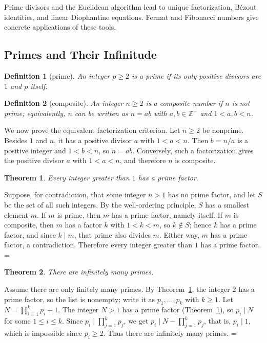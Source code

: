 \documentclass[11pt]{article}
\makeatletter
\theoremstyle{ntstyle}
\newtheorem{theorem}{Theorem}[subsection]
\newtheorem{definition}{Definition}[subsection]
\let\nt@closedisplay\]
\def\nt@guardedclose{\@ifnextchar\par{\nt@closeafterpar}{\@ifnextchar\end{\postdisplaypenalty\@M\nt@closedisplay}{\nt@closedisplay}}}
\def\nt@closeafterpar\par{\@ifnextchar\par{\nt@closeafterpar}{\@ifnextchar\end{\postdisplaypenalty\@M\nt@closedisplay\par}{\nt@closedisplay\par}}}
\renewenvironment{proof}[1][\proofname]{\par
  \pushQED{\qed}\normalfont\topsep\medskipamount\edef\nt@afterproof{\@endparpenalty=\the\@endparpenalty\relax}\@beginparpenalty\@M\@endparpenalty\@M\let\]\nt@guardedclose\trivlist\item[]\textit{#1\@addpunct{.}} \ignorespaces}{\ifvmode\addpenalty\@M\fi\popQED\nt@afterproof\endtrivlist\@endpefalse}
\makeatother
\begin{document}
Prime divisors and the Euclidean algorithm lead to unique factorization, B{\'e}zout identities, and linear Diophantine
equations. Fermat and Fibonacci numbers give concrete applications of these tools.

\subsection{Primes and Their Infinitude}

\begin{definition}[prime]\label{def:2.1.1} An integer $p \ge 2$
	is a prime if its only positive divisors are $1$ and $p$ itself.
\end{definition}
\begin{definition}[composite]\label{def:2.1.2} An integer $n \ge 2$ is a
	composite number if $n$ is not prime; equivalently, $n$ can be written as $n = ab$ with $a, b \in
	\mathbb{Z}^+$ and $1 < a, b < n$.
\end{definition}

We now prove the equivalent factorization criterion. Let $n\ge2$ be nonprime.
Besides $1$ and $n$, it has a positive divisor $a$ with $1<a<n$.
Then $b=n/a$ is a positive integer and $1<b<n$, so $n=ab$.
Conversely, such a factorization gives the positive divisor $a$ with $1<a<n$,
and therefore $n$ is composite.

\begin{theorem}\label{thm:2.1.1} Every integer greater than $1$ has
	a prime factor.
\end{theorem}

\begin{proof} Suppose, for contradiction, that some
	integer $n > 1$ has no prime factor, and let $S$ be the set of all
	such integers. By the well-ordering principle, $S$ has a smallest
	element $m$. If $m$ is prime, then $m$ has a prime factor, namely
	itself. If $m$ is composite, then $m$ has a factor
	$k$ with $1 < k < m$, so $k \notin S$; hence $k$ has a prime factor,
	and since $k \mid m$, that prime also divides $m$. Either way, $m$ has
	a prime factor, a contradiction. Therefore every integer greater than
	$1$ has a prime factor.
\end{proof}
\begin{theorem}\label{thm:2.1.2} There are infinitely many primes.
\end{theorem}

\begin{proof} Assume there are only finitely many primes.
	By Theorem~\ref{thm:2.1.1}, the integer $2$ has a prime factor, so the
	list is nonempty; write it as $p_1,\ldots,p_k$ with $k\ge1$.
	Let $N = \prod_{i=1}^{k} p_i + 1$. The integer $N > 1$
	has a prime factor (Theorem~\ref{thm:2.1.1}), so $p_i \mid N$ for some $1 \le
		i \le k$. Since $p_i \mid \prod_{j=1}^{k} p_j$, we get $p_i \mid N -
		\prod_{j=1}^{k} p_j$, that is, $p_i \mid 1$, which is impossible since
	$p_i\ge2$. Thus there are infinitely many primes.
\end{proof}
\end{document}
